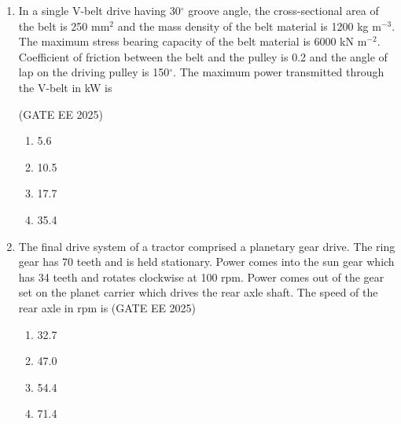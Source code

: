 \documentclass[journal,12pt,onecolumn]{IEEEtran}
\theoremstyle{remark}
\begin{document}
\begin{enumerate}
\hfill(GATE EE 2025)

\begin{multicols}{4}
\begin{enumerate}
    \item 920
    \item 1440
    \item 2160
    \item 2880
\end{enumerate}
\end{multicols}

\item In a single V-belt drive having 30$^\circ$ groove angle, the cross-sectional area of the belt is 250 mm$^{2}$ and the mass density of the belt material is 1200 kg m$^{-3}$. The maximum stress bearing capacity of the belt material is 6000 kN m$^{-2}$. Coefficient of friction between the belt and the pulley is 0.2 and the angle of lap on the driving pulley is 150$^\circ$. The maximum power transmitted through the V-belt in kW is

\hfill(GATE EE 2025)

\begin{multicols}{4}
\begin{enumerate}
    \item 5.6
    \item 10.5
    \item 17.7
    \item 35.4
\end{enumerate}
\end{multicols}

    \item The final drive system of a tractor comprised a planetary gear drive. 
    The ring gear has 70 teeth and is held stationary. Power comes into the sun gear which has 34 teeth and rotates clockwise at 100 rpm. 
    Power comes out of the gear set on the planet carrier which drives the rear axle shaft. 
    The speed of the rear axle in rpm is
    \hfill(GATE EE 2025)
    
    \begin{multicols}{4}
    \begin{enumerate}
        \item 32.7
        \item 47.0
        \item 54.4
        \item 71.4
    \end{enumerate}
    \end{multicols}


\end{enumerate}
\end{document}
